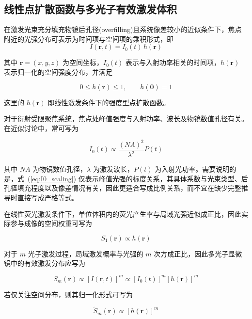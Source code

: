 \subsection{线性点扩散函数与多光子有效激发体积}\label{2.2.1}
在激发光束充分填充物镜后孔径(overfilling)且系统像差较小的近似条件下，焦点附近的光强分布可表示为时间项与空间项的乘积形式，即
\begin{equation}
  I(\mathbf{r},t)=I_{0}(t)\,h(\mathbf{r})
  \label{eq:psf_separation}
\end{equation}

其中 $\mathbf{r}=(x,y,z)$ 为空间坐标，$I_{0}(t)$ 表示与入射功率相关的时间项，$h(\mathbf{r})$ 表示归一化的空间强度分布，并满足

\begin{equation}
  0\le h(\mathbf{r})\le 1,\qquad h(\mathbf{0})=1
\end{equation}

这里的 $h(\mathbf{r})$ 即线性激发条件下的强度型点扩散函数。

对于衍射受限聚焦系统，焦点处峰值强度与入射功率、波长及物镜数值孔径有关。在近似讨论中，常可写为

\begin{equation}
  I_{0}(t)\propto \frac{(NA)^2}{\lambda^2}P(t)
  \label{eq:I0_scaling}
\end{equation}

其中 $NA$ 为物镜数值孔径，$\lambda$ 为激发波长，$P(t)$ 为入射光功率。需要说明的是，式~(\ref{eq:I0_scaling}) 仅表示峰值光强的标度关系，其具体系数与光束类型、后孔径填充程度以及像差情况有关，因此更适合写成比例关系，而不宜在缺少完整推导时直接写成严格等式。

在线性荧光激发条件下，单位体积内的荧光产生率与局域光强近似成正比，因此实际参与成像的空间权重可写为

\begin{equation}
  S_{1}(\mathbf{r})\propto h(\mathbf{r})
  \label{eq:linear_psf}
\end{equation}

对于 $m$ 光子激发过程，局域激发概率与光强的 $m$ 次方成正比，因此多光子显微镜中的有效激发分布应写为

\begin{equation}
  S_{m}(\mathbf{r})\propto [I(\mathbf{r},t)]^{m}
  \propto [I_{0}(t)]^{m}[h(\mathbf{r})]^{m}
  \label{eq:multiphoton_psf}
\end{equation}

若仅关注空间分布，则其归一化形式可写为

\begin{equation}
  \widetilde{S}_{m}(\mathbf{r})\propto [h(\mathbf{r})]^{m}
  \label{eq:effective_psf}
\end{equation}

